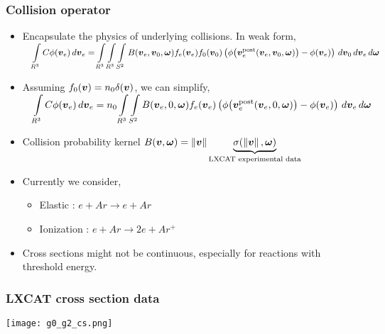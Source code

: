\documentclass[mathserif, aspectratio=169]{beamer}
\newcommand{\vect}[1]{\boldsymbol{#1}}
\newcommand{\of}[1]{\mleft( #1 \mright)}
\newcommand{\myint}{\int\limits}
\newcommand{\diff}[1]{\, d#1}
\newcommand{\norm}[1]{\left\lVert#1\right\rVert}
\begin{document}
\begin{frame}
	\frametitle{Collision operator}
	\begin{itemize}
		\item Encapsulate the physics of underlying collisions. In weak form, 
		$
		\displaystyle
		\quad 
		\myint_{R^3} C \phi\of{\vect{v}_e} \diff{\vect{v}_e} 
		=
		\myint_{R^3} \myint_{R^3} \myint_{S^2} 
		B\of{\vect{v}_e, \vect{v}_0, \vect{\omega}} 
		f_e\of{\vect{v}_e} f_0\of{\vect{v}_0} 
		\left(
		\phi\of{\vect{v}_e^\text{post}\of{\vect{v}_e, \vect{v}_0, \vect{\omega}}} 
		- \phi\of{\vect{v}_e} 
		\right)
		\diff{\vect{v}_0} \diff{\vect{v}_e} \diff{\vect{\omega}}
		$
		\item Assuming $f_0\of{\vect{v}} = n_0 \delta\of{\vect{v}}$, we can simplify, 
		$
		\displaystyle
		\quad 
		\myint_{R^3} C \phi\of{\vect{v}_e} \diff{\vect{v}_e} 
		=
		n_0 \myint_{R^3} \myint_{S^2} 
		B\of{\vect{v}_e, 0, \vect{\omega}} 
		f_e\of{\vect{v}_e}
		\left(
		\phi\of{\vect{v}_e^\text{post}\of{\vect{v}_e, 0, \vect{\omega}}} 
		- \phi\of{\vect{v}_e} 
		\right)
		\diff{\vect{v}_e} \diff{\vect{\omega}}
		$
		\item Collision probability kernel $B\of{\vect{v}, \vect{\omega}}=\norm{\vect{v}} \underbrace{\sigma(\norm{\vect{v}}, \vect{\omega})}_{\text{LXCAT experimental data}}$
		\item Currently we consider, 
		\begin{itemize}
			\item Elastic    : $e + Ar \rightarrow e + Ar$ 
			\item Ionization : $e + Ar \rightarrow 2e + Ar^+$ 
		\end{itemize}
		\item Cross sections might not be continuous, especially for reactions with threshold energy.  
	\end{itemize}
\end{frame}

\begin{frame}
	\frametitle{LXCAT cross section data}
		\centering
		\texttt{[image: g0\_g2\_cs.png]}
\end{frame}
\end{document}
